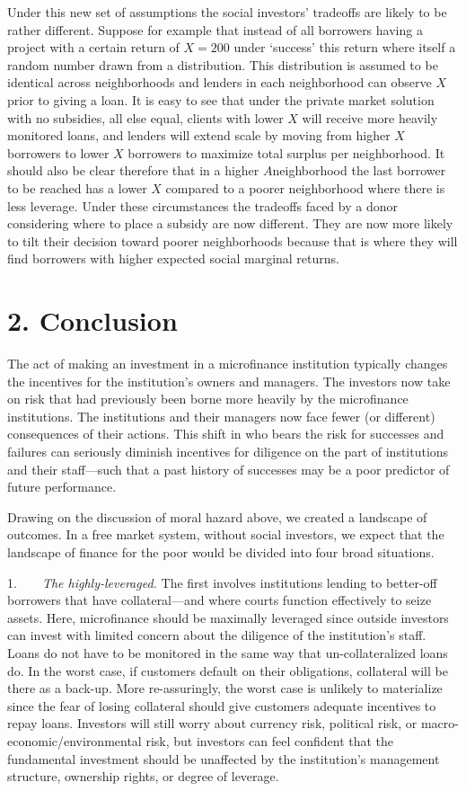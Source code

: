 \documentclass[
]{article}
\begin{document}
Under this new set of assumptions the social investors' tradeoffs are
likely to be rather different. Suppose for example that instead of all
borrowers having a project with a certain return of \(X = 200\) under
`success' this return where itself a random number drawn from a
distribution. This distribution is assumed to be identical across
neighborhoods and lenders in each neighborhood can observe \(X\) prior
to giving a loan. It is easy to see that under the private market
solution with no subsidies, all else equal, clients with lower \(X\)
will receive more heavily monitored loans, and lenders will extend scale
by moving from higher \(X\) borrowers to lower \(X\) borrowers to
maximize total surplus per neighborhood. It should also be clear
therefore that in a higher \(A\)neighborhood the last borrower to be
reached has a lower \(X\) compared to a poorer neighborhood where there
is less leverage. Under these circumstances the tradeoffs faced by a
donor considering where to place a subsidy are now different. They are
now more likely to tilt their decision toward poorer neighborhoods
because that is where they will find borrowers with higher expected
social marginal returns.

\hypertarget{conclusion}{%
\section{2. Conclusion}\label{conclusion}}

The act of making an investment in a microfinance institution typically
changes the incentives for the institution's owners and managers. The
investors now take on risk that had previously been borne more heavily
by the microfinance institutions. The institutions and their managers
now face fewer (or different) consequences of their actions. This shift
in who bears the risk for successes and failures can seriously diminish
incentives for diligence on the part of institutions and their
staff---such that a past history of successes may be a poor predictor of
future performance.

Drawing on the discussion of moral hazard above, we created a landscape
of outcomes. In a free market system, without social investors, we
expect that the landscape of finance for the poor would be divided into
four broad situations.

1.  \emph{The highly-leveraged.} The first involves institutions lending
to better-off borrowers that have collateral---and where courts function
effectively to seize assets. Here, microfinance should be maximally
leveraged since outside investors can invest with limited concern about
the diligence of the institution's staff. Loans do not have to be
monitored in the same way that un-collateralized loans do. In the worst
case, if customers default on their obligations, collateral will be
there as a back-up. More re-assuringly, the worst case is unlikely to
materialize since the fear of losing collateral should give customers
adequate incentives to repay loans. Investors will still worry about
currency risk, political risk, or macro-economic/environmental risk, but
investors can feel confident that the fundamental investment should be
unaffected by the institution's management structure, ownership rights,
or degree of leverage.
\end{document}
